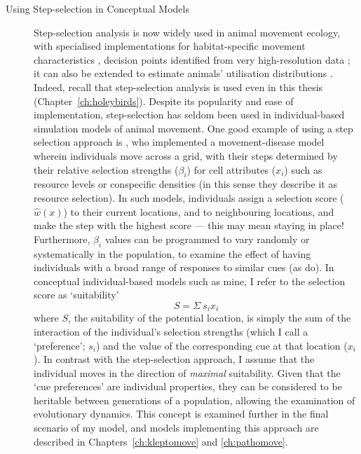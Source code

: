 \begin{tcolorbox}[width=\textwidth,
    boxsep=0pt,
    left=0pt,
    right=0pt,
    top=2pt,
    arc=0pt,
    boxrule=0.0pt,toprule=1pt,
    bottomrule=1pt,
    colback=white
    ]%
    \begin{description}
        \item[Using Step-selection in Conceptual Models] Step-selection analysis is now widely used in animal movement ecology, with specialised implementations for habitat-specific movement characteristics \parencite{avgar2016}, decision points identified from very high-resolution data \parencite{munden2021}; it can also be extended to estimate animals' utilisation distributions \parencite{signer2017}.
        Indeed, recall that step-selection analysis is used even in this thesis (Chapter~\ref{ch:holeybirds}).
        Despite its popularity and ease of implementation, step-selection has seldom been used in individual-based simulation models of animal movement.
        One good example of using a step selection approach is \textcite{white2018}, who implemented a movement-disease model wherein individuals move across a grid, with their steps determined by their relative selection strengths ($\beta_i$) for cell attributes ($x_i$) such as resource levels or conspecific densities (in this sense they describe it as resource selection).
        In such models, individuals assign a selection score ($\hat{w}(x)$) to their current locations, and to neighbouring locations, and make the step with the highest score --- this may mean staying in place!
        Furthermore, $\beta_i$ values can be programmed to vary randomly or systematically in the population, to examine the effect of having individuals with a broad range of responses to similar cues (as \cite{white2018} do).
        In conceptual individual-based models such as mine, I refer to the selection score as `suitability'
        $$
            S = \Sigma~s_{i}x_{i}
        $$
        where $S$, the suitability of the potential location, is simply the sum of the interaction of the individual's selection strengths (which I call a `preference'; $s_i$) and the value of the corresponding cue at that location ($x_i$).
        In contrast with the step-selection approach, I assume that the individual moves in the direction of \emph{maximal} suitability. 
        Given that the `cue preferences' are individual properties, they can be considered to be heritable between generations of a population, allowing the examination of evolutionary dynamics.
        This concept is examined further in the final scenario of my model, and models implementing this approach are described in Chapters~\ref{ch:kleptomove} and \ref{ch:pathomove}.
    \end{description}
\end{tcolorbox}

